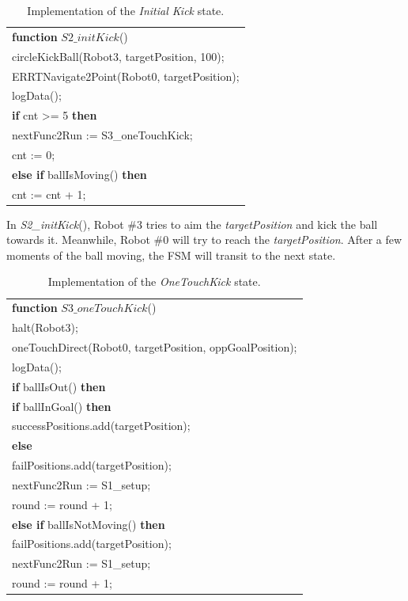 \documentclass[runningheads]{llncs}
\begin{document}
\begin{table}[H]
\caption{Implementation of the \textit{Initial Kick} state.}
\center
\label{table_STATE2_IMP}
\begin{tabular}{|p{10cm}|}
\hline

\textbf{function}
$ S2\_initKick$()\\
\quad circleKickBall(Robot3, targetPosition, 100);\\
\quad ERRTNavigate2Point(Robot0, targetPosition);\\
\quad logData();\\
\quad \textbf{if} cnt >= 5 \textbf{then}\\
\quad\quad nextFunc2Run := S3\_oneTouchKick;\\
\quad\quad cnt := 0;\\
\quad \textbf{else if} ballIsMoving() \textbf{then}\\
\quad\quad cnt := cnt + 1;\\

\hline
\end{tabular}
\end{table}

In \textit{S2\_initKick}(), Robot \#3 tries to aim the \textit{targetPosition} and kick the ball towards it. Meanwhile, Robot \#0 will try to reach the \textit{targetPosition}. After a few moments of the ball moving, the FSM will transit to the next state.


\begin{table}[H]
\caption{Implementation of the \textit{OneTouchKick} state.}
\center
\label{table_STATE3_IMP}
\begin{tabular}{|p{10cm}|}
\hline

\textbf{function}
$ S3\_oneTouchKick$()\\
\quad halt(Robot3);\\
\quad oneTouchDirect(Robot0, targetPosition, oppGoalPosition);\\
\quad logData();\\
\quad \textbf{if} ballIsOut() \textbf{then}\\
\quad\quad \textbf{if} ballInGoal() \textbf{then}\\
\quad\quad\quad successPositions.add(targetPosition);\\
\quad\quad \textbf{else} \\ 
\quad\quad\quad failPositions.add(targetPosition);\\
\quad\quad nextFunc2Run := S1\_setup;\\
\quad\quad round := round + 1;\\
\quad \textbf{else if} ballIsNotMoving() \textbf{then}\\
\quad\quad failPositions.add(targetPosition);\\
\quad\quad nextFunc2Run := S1\_setup;\\
\quad\quad round := round + 1;\\

\hline
\end{tabular}
\end{table}
\end{document}
